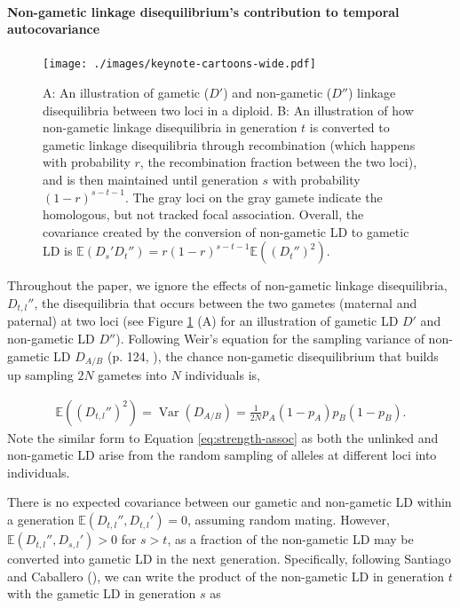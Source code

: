 \documentclass[11pt]{article}
\newcommand{\E}{\mathbb{E}}
\DeclareMathOperator{\var}{Var}
\begin{document}
\paragraph{Non-gametic linkage disequilibrium's contribution to temporal autocovariance}
\label{ap:non-gametic}

\begin{figure}[!ht]
  \centering
  \texttt{[image: ./images/keynote-cartoons-wide.pdf]}

  \caption{A: An illustration of gametic ($D'$) and non-gametic ($D''$) linkage
    disequilibria between two loci in a diploid. B: An illustration of how
    non-gametic linkage disequilibria in generation $t$ is converted to gametic
    linkage disequilibria through recombination (which happens with probability
    $r$, the recombination fraction between the two loci), and is then
    maintained until generation $s$ with probability $(1-r)^{s-t-1}$. The gray
    loci on the gray gamete indicate the homologous, but not tracked focal
    association. Overall, the covariance created by the conversion of non-gametic
    LD to gametic LD is $\E(D_{s}' D_{t}'') = r(1-r)^{s-t-1}\E\left((D_{t}'')^2\right)$.}

  \label{fig:ld-cartoon}
\end{figure}


Throughout the paper, we ignore the effects of non-gametic linkage
disequilibria, $D_{t,l}''$, the disequilibria that occurs between the two
gametes (maternal and paternal) at two loci (see Figure \ref{fig:ld-cartoon}
(A) for an illustration of gametic LD $D'$ and non-gametic LD $D''$). Following
Weir's equation for the sampling variance of non-gametic LD $D_{A/B}$ (p. 124,
\citeyear{Weir1996-mv}), the chance non-gametic disequilibrium that builds up
sampling $2N$ gametes into $N$ individuals is,

\begin{align}
  \E\left((D_{t,l}'')^2\right) = \var(D_{A/B})  = \frac{1}{2N} p_A (1-p_A) p_B (1-p_B).
  \label{eq:non-gametic}
\end{align}
%
Note the similar form to Equation \eqref{eq:strength-assoc} as both the
unlinked and non-gametic LD arise from the random sampling of alleles at
different loci into individuals.

There is no expected covariance between our gametic and non-gametic LD within a
generation $\E(D_{t,l}'', D_{t,l}')=0$, assuming random mating. However,
$\E(D_{t,l}'',D_{s,l}')>0$ for $s>t$, as a fraction of the non-gametic LD
may be converted into gametic LD in the next generation. Specifically,
following Santiago and Caballero (\citeyear{Santiago1995-hx}), we can write the
product of the non-gametic LD in generation $t$ with the gametic LD in
generation $s$ as
\end{document}
